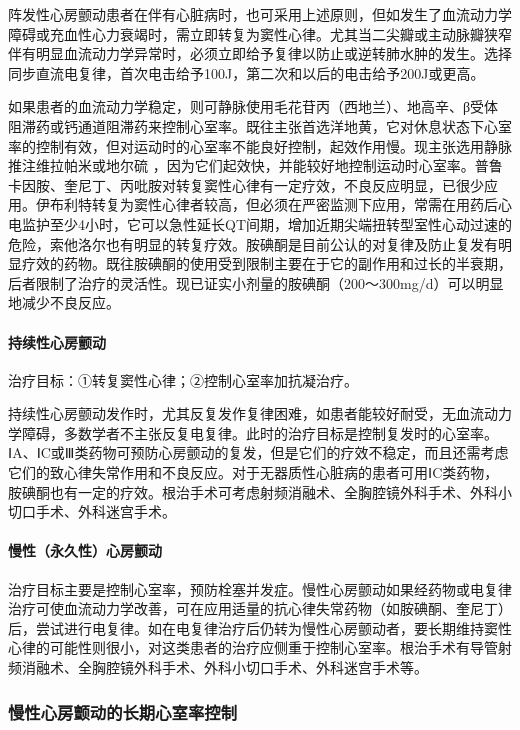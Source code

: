 阵发性心房颤动患者在伴有心脏病时，也可采用上述原则，但如发生了血流动力学障碍或充血性心力衰竭时，需立即转复为窦性心律。尤其当二尖瓣或主动脉瓣狭窄伴有明显血流动力学异常时，必须立即给予复律以防止或逆转肺水肿的发生。选择同步直流电复律，首次电击给予100J，第二次和以后的电击给予200J或更高。

如果患者的血流动力学稳定，则可静脉使用毛花苷丙（西地兰）、地高辛、β受体阻滞药或钙通道阻滞药来控制心室率。既往主张首选洋地黄，它对休息状态下心室率的控制有效，但对运动时的心室率不能良好控制，起效作用慢。现主张选用静脉推注维拉帕米或地尔硫{}
，因为它们起效快，并能较好地控制运动时心室率。普鲁卡因胺、奎尼丁、丙吡胺对转复窦性心律有一定疗效，不良反应明显，已很少应用。伊布利特转复为窦性心律者较高，但必须在严密监测下应用，常需在用药后心电监护至少4小时，它可以急性延长QT间期，增加近期尖端扭转型室性心动过速的危险，索他洛尔也有明显的转复疗效。胺碘酮是目前公认的对复律及防止复发有明显疗效的药物。既往胺碘酮的使用受到限制主要在于它的副作用和过长的半衰期，后者限制了治疗的灵活性。现已证实小剂量的胺碘酮（200～300mg/d）可以明显地减少不良反应。

\paragraph{持续性心房颤动}

治疗目标：①转复窦性心律；②控制心室率加抗凝治疗。

持续性心房颤动发作时，尤其反复发作复律困难，如患者能较好耐受，无血流动力学障碍，多数学者不主张反复电复律。此时的治疗目标是控制复发时的心室率。ⅠA、ⅠC或Ⅲ类药物可预防心房颤动的复发，但是它们的疗效不稳定，而且还需考虑它们的致心律失常作用和不良反应。对于无器质性心脏病的患者可用ⅠC类药物，胺碘酮也有一定的疗效。根治手术可考虑射频消融术、全胸腔镜外科手术、外科小切口手术、外科迷宫手术。

\paragraph{慢性（永久性）心房颤动}

治疗目标主要是控制心室率，预防栓塞并发症。慢性心房颤动如果经药物或电复律治疗可使血流动力学改善，可在应用适量的抗心律失常药物（如胺碘酮、奎尼丁）后，尝试进行电复律。如在电复律治疗后仍转为慢性心房颤动者，要长期维持窦性心律的可能性则很小，对这类患者的治疗应侧重于控制心室率。根治手术有导管射频消融术、全胸腔镜外科手术、外科小切口手术、外科迷宫手术等。

\subsubsection{慢性心房颤动的长期心室率控制}


